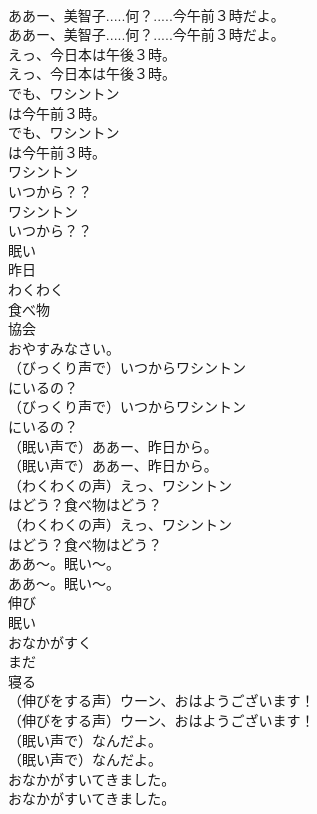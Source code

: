 \documentclass[8pt]{extreport}
\begin{document}
\begin{CJK}{UTF8}{min}
\\	ああー、美智子.....何？.....今午前３時だよ。	
\\	ああー、美智子.....何？.....今午前３時だよ。 
\\	えっ、今日本は午後３時。	
\\	えっ、今日本は午後３時。 
\\	でも、ワシントン
\\	は今午前３時。	
\\	でも、ワシントン
\\	は今午前３時。 
\\	ワシントン
\\	いつから？？	
\\	ワシントン
\\	いつから？？　 
\\	眠い
\\	昨日
\\	わくわく
\\	食べ物
\\	協会
\\	おやすみなさい。
\\	（びっくり声で）いつからワシントン
\\	にいるの？	
\\	（びっくり声で）いつからワシントン
\\	にいるの？ 
\\	（眠い声で）ああー、昨日から。	
\\	（眠い声で）ああー、昨日から。 
\\	（わくわくの声）えっ、ワシントン
\\	はどう？食べ物はどう？	
\\	（わくわくの声）えっ、ワシントン
\\	はどう？食べ物はどう？ 
\\	ああ〜。眠い〜。	
\\	ああ〜。眠い〜。 
\\	伸び
\\	眠い
\\	おなかがすく
\\	まだ
\\	寝る
\\	（伸びをする声）ウーン、おはようございます！	
\\	（伸びをする声）ウーン、おはようございます！ 
\\	（眠い声で）なんだよ。	
\\	（眠い声で）なんだよ。 
\\	おなかがすいてきました。	
\\	おなかがすいてきました。 

\end{CJK}
\end{document}
